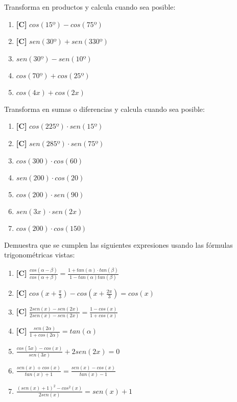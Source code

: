 \Exercicio Transforma en productos y calcula cuando sea posible:

\begin{enumerate}[topsep=0pt]
	\item \textbf{[C]} $cos(15º) - cos(75º)$
	\item \textbf{[C]} $sen(30º) + sen(330º)$
	
	\item $sen(30º) - sen(10º)$
	\item $cos(70º) + cos(25º)$
	\item $cos(4x) + cos(2x)$
\end{enumerate}


\Exercicio Transforma en sumas o diferencias y calcula cuando sea posible:

\begin{enumerate}[topsep=0pt]
	\item \textbf{[C]} $cos(225º) \cdot sen(15º)$
	\item \textbf{[C]} $sen(285º) \cdot sen(75º)$
	\item $cos(300) \cdot cos(60)$
	\item $sen(200) \cdot cos(20)$
	\item $cos(200) \cdot sen(90)$
	\item $sen(3x)\cdot sen(2x)$
	\item $cos(200)\cdot cos(150)$
\end{enumerate}


\Exercicio Demuestra que se cumplen las siguientes expresiones usando las fórmulas trigonométricas vistas:

\begin{enumerate}[topsep=0pt]
	\item \textbf{[C]} $ \frac{cos(\alpha - \beta)}{cos(\alpha + \beta)} = \frac{1 + tan(\alpha) \cdot tan(\beta)}{1-tan(\alpha)tan(\beta)} $
	\item \textbf{[C]} $ cos(x + \frac{\pi}{3}) - cos(x + \frac{2\pi}{3}) = cos(x)$
	\item \textbf{[C]} $ \frac{2 sen(x) - sen(2x)}{2 sen(x) - sen(2x)} = \frac{1 - cos(x)}{1 + cos(x)}$
	\item \textbf{[C]} $ \frac{sen(2\alpha)}{1 + cos(2\alpha)} = tan(\alpha)$
	\item $\frac{cos(5x) - cos(x)}{sen(3x)} + 2 sen(2x) = 0$
	\item $\frac{sen(x)+cos(x)}{tan(x)+1} = \frac{sen(x) - cos(x)}{tan(x)-1}$
	\item $\frac{(sen(x)+1)^2-cos^2(x)}{2 sen(x)} = sen(x) + 1$
\end{enumerate}


